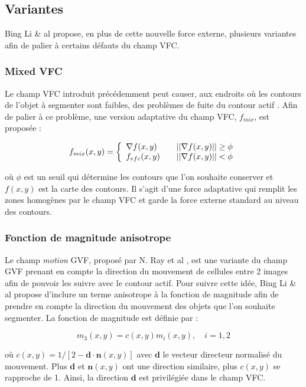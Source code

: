 \subsection{Variantes}
Bing Li \& al propose, en plus de cette nouvelle force externe, plusieurs variantes afin de palier à certains défauts du champ VFC.

\subsubsection*{Mixed VFC}

Le champ VFC introduit précédemment peut causer, aux endroits où les contours de l'objet à segmenter sont faibles, des problèmes de fuite du contour actif \cite{vfc}. Afin de palier à ce problème, une version adaptative du champ VFC, $f_{mix}$, est proposée :

\begin{equation}
 f_{mix}(x,y) = \left\{ 
  \begin{array}{l l}
    \nabla f(x,y) & \quad ||\nabla f(x,y)|| \geq \phi \\
     f_{vfc}(x,y) & \quad ||\nabla f(x,y)||   <  \phi
  \end{array} \right.
\end{equation}

où $\phi$ est un seuil qui détermine les contours que l'on souhaite conserver et $f(x,y)$ est la carte des contours. Il s'agit d'une force adaptative qui remplit les zones homogènes par le champ VFC et garde la force externe standard au niveau des contours.

\subsubsection*{Fonction de magnitude anisotrope}

Le champ \textit{motion} GVF, proposé par N. Ray et al \cite{mgvf}, est une variante du champ GVF prenant en compte la direction du mouvement de cellules entre 2 images afin de pouvoir les suivre avec le contour actif. Pour suivre cette idée, Bing Li \& al propose d'inclure un terme anisotrope à la fonction de magnitude afin de prendre en compte la direction du mouvement des objets que l'on souhaite segmenter. La fonction de magnitude est définie par :

\begin{equation}
	m_3(x,y) = c(x,y)m_i(x,y), \quad i=1,2
\end{equation}

où $c(x,y)=1/[2-\mathbf{d} \cdot \mathbf{n}(x,y)]$ avec $\mathbf{d}$ le vecteur directeur normalisé du mouvement. Plus $\mathbf{d}$ et $\mathbf{n}(x,y)$ ont une direction similaire, plus $c(x,y)$ se rapproche de 1. Ainsi, la direction $\mathbf{d}$ est privilégiée dans le champ VFC. 
